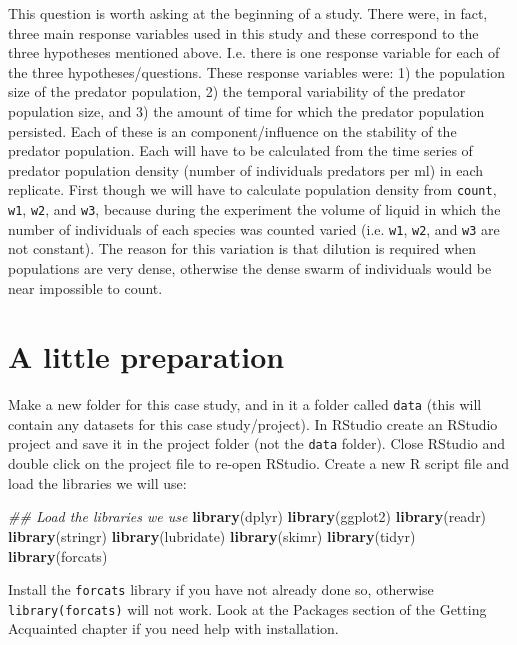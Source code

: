 \documentclass[]{book}
\newenvironment{Shaded}{\begin{snugshade}}{\end{snugshade}}
\newcommand{\CommentTok}[1]{\textcolor[rgb]{0.56,0.35,0.01}{\textit{#1}}}
\newcommand{\KeywordTok}[1]{\textcolor[rgb]{0.13,0.29,0.53}{\textbf{#1}}}
\newcommand{\NormalTok}[1]{#1}
\begin{document}
This question is worth asking at the beginning of a study. There were, in fact, three main response variables used in this study and these correspond to the three hypotheses mentioned above. I.e. there is one response variable for each of the three hypotheses/questions. These response variables were: 1) the population size of the predator population, 2) the temporal variability of the predator population size, and 3) the amount of time for which the predator population persisted. Each of these is an component/influence on the stability of the predator population. Each will have to be calculated from the time series of predator population density (number of individuals predators per ml) in each replicate. First though we will have to calculate population density from \texttt{count}, \texttt{w1}, \texttt{w2}, and \texttt{w3}, because during the experiment the volume of liquid in which the number of individuals of each species was counted varied (i.e. \texttt{w1}, \texttt{w2}, and \texttt{w3} are not constant). The reason for this variation is that dilution is required when populations are very dense, otherwise the dense swarm of individuals would be near impossible to count.

\hypertarget{a-little-preparation-1}{%
\section{A little preparation}\label{a-little-preparation-1}}

Make a new folder for this case study, and in it a folder called \texttt{data} (this will contain any datasets for this case study/project). In RStudio create an RStudio project and save it in the project folder (not the \texttt{data} folder). Close RStudio and double click on the project file to re-open RStudio. Create a new R script file and load the libraries we will use:

\begin{Shaded}
\begin{Highlighting}[]
\CommentTok{## Load the libraries we use}
\KeywordTok{library}\NormalTok{(dplyr)}
\KeywordTok{library}\NormalTok{(ggplot2)}
\KeywordTok{library}\NormalTok{(readr)}
\KeywordTok{library}\NormalTok{(stringr)}
\KeywordTok{library}\NormalTok{(lubridate)}
\KeywordTok{library}\NormalTok{(skimr)}
\KeywordTok{library}\NormalTok{(tidyr)}
\KeywordTok{library}\NormalTok{(forcats)}
\end{Highlighting}
\end{Shaded}

\begin{action}
Install the \texttt{forcats} library if you have not already done so,
otherwise \texttt{library(forcats)} will not work. Look at the Packages
section of the Getting Acquainted chapter if you need help with
installation.
\end{action}
\end{document}
